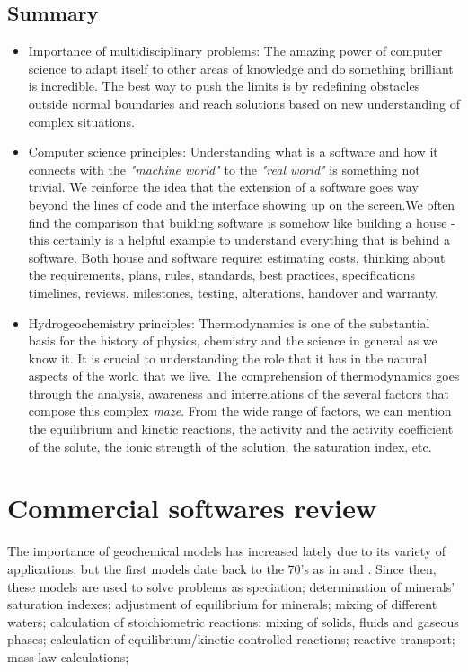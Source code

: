 \documentclass[ppgc,mestrado,english]{iiufrgs}
\begin{document}
\section{Summary}
\begin{itemize}
\item Importance of multidisciplinary problems: The amazing power of computer science to adapt itself to other areas of knowledge and do something brilliant is incredible. The best way to push the limits is by redefining obstacles outside normal boundaries and reach solutions based on new understanding of complex situations.
\item Computer science principles: Understanding what is a software and how it connects with the \emph{"machine world"} to the \emph{"real world"} is something not trivial. We reinforce the idea that the extension of a software goes way beyond the lines of code and the interface showing up on the screen.We often find the comparison that building software is somehow like building a house - this certainly is a helpful example to understand everything that is behind a software. Both house and software require: estimating costs, thinking about the requirements, plans, rules, standards, best practices, specifications timelines, reviews, milestones, testing, alterations, handover and warranty.
\item Hydrogeochemistry principles: Thermodynamics is one of the substantial basis for the history of physics, chemistry and the science in general as we know it. It is crucial to understanding the role that it has in the natural aspects of the world that we live. The comprehension of thermodynamics goes through the analysis, awareness and interrelations of the several factors that compose this complex \emph{maze}. From the wide range of factors, we can mention the equilibrium and kinetic reactions, the activity and the activity coefficient of the solute, the ionic strength of the solution, the saturation index, etc.
\end{itemize}



\chapter{Commercial softwares review}
\label{chapter:review}
The importance of geochemical models has increased lately due to its variety of applications, but the first models date back to the 70’s as in \cite{Westall:76} and \cite{Wolery:79}. Since then, these models are used to solve problems as  speciation; determination of minerals' saturation indexes; adjustment of equilibrium for minerals; mixing of different waters; calculation of stoichiometric reactions; mixing of solids, fluids and gaseous phases; calculation of equilibrium/kinetic controlled reactions; reactive transport; mass-law calculations;
\end{document}
